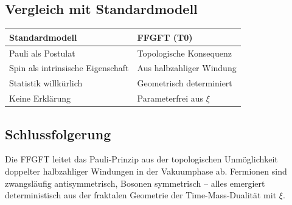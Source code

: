 	\subsection*{Vergleich mit Standardmodell}
	
	\begin{center}
		\begin{tabular}{p{}p{}}
			\textbf{Standardmodell} & \textbf{FFGFT (T0)} \\
			\hline
			Pauli als Postulat & Topologische Konsequenz \\
			Spin als intrinsische Eigenschaft & Aus halbzahliger Windung \\
			Statistik willkürlich & Geometrisch determiniert \\
			Keine Erklärung & Parameterfrei aus \(\xi\) \\
		\end{tabular}
	\end{center}
	
	\subsection*{Schlussfolgerung}
	
	Die FFGFT leitet das Pauli-Prinzip aus der topologischen Unmöglichkeit doppelter halbzahliger Windungen in der Vakuumphase ab. Fermionen sind zwangsläufig antisymmetrisch, Bosonen symmetrisch – alles emergiert deterministisch aus der fraktalen Geometrie der Time-Mass-Dualität mit \(\xi\).



